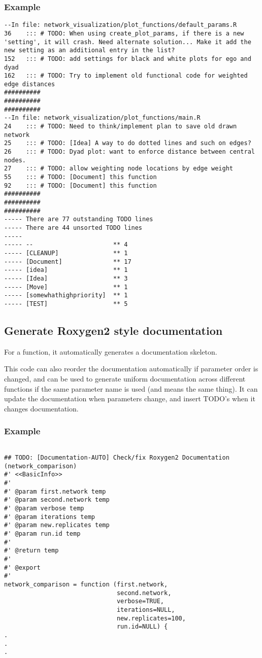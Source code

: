 \documentclass[11pt]{article}
\begin{document}
\subsubsection{Example}
\begin{verbatim}
--In file: network_visualization/plot_functions/default_params.R
36    ::: # TODO: When using create_plot_params, if there is a new 'setting', it will crash. Need alternate solution... Make it add the new setting as an additional entry in the list?
152   ::: # TODO: add settings for black and white plots for ego and dyad
162   ::: # TODO: Try to implement old functional code for weighted edge distances
##########
##########
##########
--In file: network_visualization/plot_functions/main.R
24    ::: # TODO: Need to think/implement plan to save old drawn network
25    ::: # TODO: [Idea] A way to do dotted lines and such on edges?
26    ::: # TODO: Dyad plot: want to enforce distance between central nodes. 
27    ::: # TODO: allow weighting node locations by edge weight
55    ::: # TODO: [Document] this function  
92    ::: # TODO: [Document] this function
##########
##########
##########
----- There are 77 outstanding TODO lines
----- There are 44 unsorted TODO lines
-----
----- --                      ** 4  
----- [CLEANUP]               ** 1  
----- [Document]              ** 17 
----- [idea]                  ** 1  
----- [Idea]                  ** 3  
----- [Move]                  ** 1  
----- [somewhathighpriority]  ** 1  
----- [TEST]                  ** 5  
\end{verbatim}


\pagebreak
\subsection{Generate Roxygen2 style documentation}
For a function, it automatically generates a documentation skeleton. 

This code can also reorder the documentation automatically if parameter order is changed, and can be used to generate uniform documentation across different functions if the same parameter name is used (and means the same thing). It can update the documentation when parameters change, and insert TODO's when it changes documentation. 

\subsubsection{Example}
\begin{verbatim}

## TODO: [Documentation-AUTO] Check/fix Roxygen2 Documentation (network_comparison)
#' <<BasicInfo>> 
#' 
#' @param first.network temp
#' @param second.network temp
#' @param verbose temp
#' @param iterations temp
#' @param new.replicates temp
#' @param run.id temp
#' 
#' @return temp
#' 
#' @export
#' 
network_comparison = function (first.network,
                               second.network,
                               verbose=TRUE,
                               iterations=NULL,
                               new.replicates=100,
                               run.id=NULL) {
.
.
.
\end{verbatim}
\end{document}
